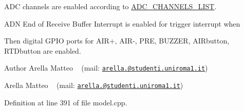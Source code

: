 A\+DC channels are enabled according to \mbox{\hyperlink{group___board__model__group_ga8b6fbd5b46174be3b86bc1ab5daa9080}{A\+D\+C\+\_\+\+C\+H\+A\+N\+N\+E\+L\+S\+\_\+\+L\+I\+ST}}.

A\+DN End of Receive Buffer Interrupt is enabled for trigger interrupt when

Then digital G\+P\+IO ports for A\+I\+R+, A\+I\+R-\/, P\+RE, B\+U\+Z\+Z\+ER, A\+I\+Rbutton, R\+T\+Dbutton are enabled.

\begin{DoxyAuthor}{Author}
Arella Matteo ~\newline
 (mail\+: \href{mailto:arella.1646983@studenti.uniroma1.it}{\tt arella.@studenti.\+uniroma1.\+it})

Arella Matteo ~\newline
 (mail\+: \href{mailto:arella.1646983@studenti.uniroma1.it}{\tt arella.@studenti.\+uniroma1.\+it}) 
\end{DoxyAuthor}


Definition at line 391 of file model.\+cpp.

